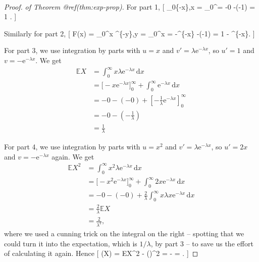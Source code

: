 \documentclass[
  letterpaper,
]{report}
\theoremstyle{definition}
\theoremstyle{definition}
\theoremstyle{remark}
\begin{document}
\begin{proof}

\emph{of Theorem @ref(thm:exp-prop).} For part 1, {[}
\int\_0\textsuperscript{\infty \lambda {}}\{-\lambda x\},x
= \_0\^{}\infty = -0 -(-1) = 1 . {]}

Similarly for part 2, {[} F(x) = \int\_0\^{}x
\lambda {}\^{}\{-\lambda y\},y =
\_0\^{}x =
-\^{}\{-\lambda x\} -(-1) = 1 - \^{}\{-\lambda x\}.
{]}

For part 3, we use integration by parts with \(u = x\) and
\(v' = \lambda \mathrm{e}^{-\lambda x}\), so \(u' = 1\) and
\(v = -\mathrm{e}^{-\lambda x}\). We get \begin{align*}
\mathbb EX &= \int_0^\infty x  \lambda \mathrm{e}^{-\lambda x}\,\mathrm{d}x \\
  &= \big[-x \mathrm{e}^{-\lambda x}\big]_0^\infty + \int_0^\infty \mathrm{e}^{-\lambda x}\,\mathrm{d}x \\
  &= -0 - (-0) + \left[ -\frac{1}{\lambda} \mathrm{e}^{-\lambda x} \right]_0^\infty \\
  &= -0 - \left(- \frac{1}{\lambda}\right) \\
  &= \frac{1}{\lambda}
\end{align*}

For part 4, we use integration by parts with \(u = x^2\) and
\(v' = \lambda \mathrm{e}^{-\lambda x}\), so \(u' = 2x\) and
\(v = -\mathrm{e}^{-\lambda x}\) again. We get \begin{align*}
\mathbb EX^2 &= \int_0^\infty x^2  \lambda \mathrm{e}^{-\lambda x}\,\mathrm{d}x \\
  &= \big[-x^2 \mathrm{e}^{-\lambda x}\big]_0^\infty + \int_0^\infty 2x \mathrm{e}^{-\lambda x}\,\mathrm{d}x \\
  &= -0 - (-0) + \frac{2}{\lambda} \int_0^\infty x  \lambda x \mathrm{e}^{-\lambda x}\,\mathrm{d}x \\
  &= \frac{2}{\lambda} \mathbb EX \\
  &= \frac{2}{\lambda^2} ,
\end{align*} where we used a cunning trick on the integral on the right
-- spotting that we could turn it into the expectation, which is
\(1/\lambda\), by part 3 -- to save us the effort of calculating it
again. Hence {[} \Var(X) = \mathbb EX\^{}2 -
\left(\right)\^{}2 =  -
 =  . {]}

\end{proof}
\end{document}
